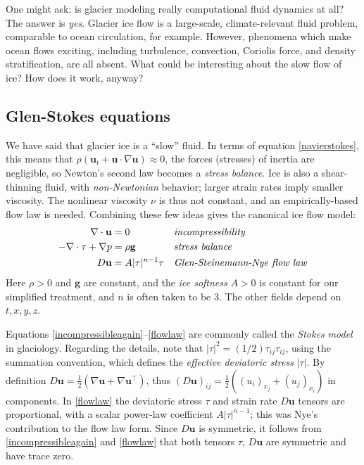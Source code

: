 \documentclass[letterpaper,final,12pt,reqno]{amsart}
\newcommand{\bg}{\mathbf{g}}
\newcommand{\bu}{\mathbf{u}}
\newcommand{\grad}{\nabla}
\begin{document}
One might ask: is glacier modeling really computational fluid dynamics at all?  The answer is \emph{yes}.  Glacier ice flow is a large-scale, climate-relevant fluid problem, comparable to ocean circulation, for example.  However, phenomena which make ocean flows exciting, including turbulence, convection, Coriolis force, and density stratification, are all absent.  What could be interesting about the slow flow of ice?  How does it work, anyway?

\subsection*{Glen-Stokes equations}  We have said that glacier ice is a ``slow'' fluid.  In terms of equation \eqref{navierstokes}, this means that $\rho \left(\mathbf{u}_t + \mathbf{u}\cdot\nabla \mathbf{u}\right) \approx 0$, the forces (stresses) of inertia are negligible, so Newton's second law becomes a \emph{stress balance}.  Ice is also a shear-thinning fluid, with \emph{non-Newtonian} behavior; larger strain rates imply smaller viscosity.  The nonlinear viscosity $\nu$ is thus not constant, and an empirically-based flow law is needed.  Combining these few ideas gives the canonical ice flow model:
\begin{align}
\nabla \cdot \mathbf{u} &= 0 &&\text{\emph{incompressibility}} \label{incompressibleagain} \\
- \nabla \cdot \tau + \nabla p &= \rho \mathbf{g} &&\text{\emph{stress balance}} \label{forcebalance} \\
D\bu &= A |\tau|^{n-1} \tau &&\text{\emph{Glen-Steinemann-Nye flow law}} \label{flowlaw}
\end{align}
Here $\rho>0$ and $\bg$ are constant, and the \emph{ice softness} $A>0$ is constant for our simplified treatment, and $n$ is often taken to be 3.  The other fields depend on $t,x,y,z$.

Equations \eqref{incompressibleagain}--\eqref{flowlaw} are commonly called the \emph{Stokes model} in glaciology.  Regarding the details, note that $|\tau|^2 = (1/2) \tau_{ij} \tau_{ij}$, using the summation convention, which defines the \emph{effective deviatoric stress} $|\tau|$.  By definition $D\bu = \frac{1}{2}(\grad \bu + \grad \bu^\top)$, thus $(D\bu)_{ij} = \frac{1}{2} \left((u_i)_{x_j}+(u_j)_{x_i}\right)$ in components.  In \eqref{flowlaw} the deviatoric stress $\tau$ and strain rate $D\bu$ tensors are proportional, with a scalar power-law coefficient $A|\tau|^{n-1}$; this was Nye's contribution to the flow law form.  Since $D\bu$ is symmetric, it follows from \eqref{incompressibleagain} and \eqref{flowlaw} that both tensors $\tau$, $D\bu$ are symmetric and have trace zero.
\end{document}
